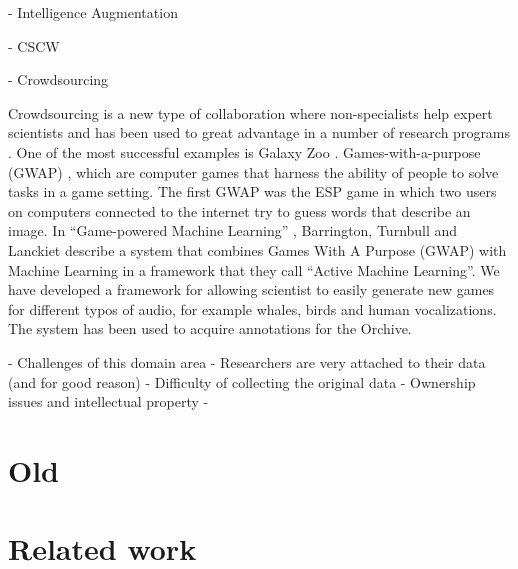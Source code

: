 - Intelligence Augmentation


- CSCW

- Crowdsourcing

Crowdsourcing is a new type of collaboration where non-specialists
help expert scientists \cite{howe08_crowdsourcing} 
and has been used to great advantage
\cite{surowiecki05_crowdsourcing} in a number
\cite{bradham08_crowdsourcing} of research programs
\cite{travis08_crowdsourcing}.
One of the most successful examples is Galaxy Zoo
\cite{anze08_galaxyzoo}. Games-with-a-purpose (GWAP) \cite{vonahn08},
which are computer games that harness the ability of people to solve
tasks in a game setting.  The first GWAP was the ESP game
\cite{vonahn04} in which two users on computers connected to the
internet try to guess words that describe an image.  In ``Game-powered
Machine Learning'' \cite{barrington12}, Barrington, Turnbull and
Lanckiet describe a system that combines Games With A Purpose (GWAP)
with Machine Learning in a framework that they call ``Active Machine
Learning''.  We have developed a framework for allowing scientist to
easily generate new games for different typos of audio, for example
whales, birds and human vocalizations. The system has been used to
acquire annotations for the Orchive.


- Challenges of this domain area
	- Researchers are very attached to their data (and for good reason)
	- Difficulty of collecting the original data
	- Ownership issues and intellectual property
	- 













\section{Old}

\section{Related work}

